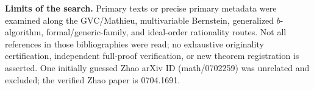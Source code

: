 \documentclass[11pt]{article}
\begin{document}
\noindent\textbf{Limits of the search.} Primary texts or precise primary metadata were examined along the GVC/Mathieu, multivariable Bernstein, generalized $b$-algorithm, formal/generic-family, and ideal-order rationality routes. Not all references in those bibliographies were read; no exhaustive originality certification, independent full-proof verification, or new theorem registration is asserted. One initially guessed Zhao arXiv ID (math/0702259) was unrelated and excluded; the verified Zhao paper is 0704.1691.
\end{document}
